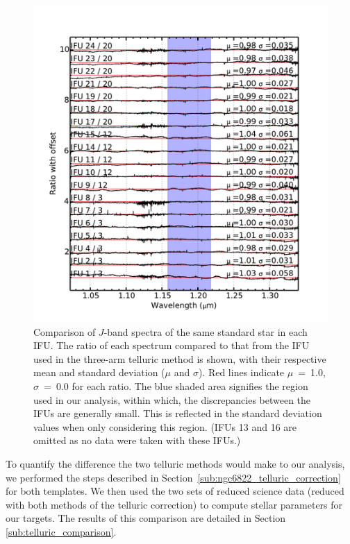 \begin{figure}
 \centering
 \begin{center}
 \includegraphics[width=12.0cm]{ngc6822/N6822_t_compare}
 \caption{
    Comparison of $J$-band spectra of the same standard star in each IFU.
    The ratio of each spectrum compared to that from the IFU used in the three-arm telluric method is shown,
    with their respective mean and standard deviation ($\mu$ and $\sigma$).
    Red lines indicate $\mu$~=~1.0, $\sigma$~=~0.0 for each ratio.
    The blue shaded area signifies the region used in our analysis,
    within which, the discrepancies between the IFUs are generally small.
    This is reflected in the standard deviation values when only considering this region.
    (IFUs 13 and 16 are omitted as no data were taken with these IFUs.) \label{fig:IFU_compare}
          }
 \end{center}
\end{figure}

To quantify the difference the two telluric methods would make to our analysis,
we performed the steps described in
Section~\ref{sub:ngc6822_telluric_correction} for both templates.
We then used the two sets of reduced science data
(reduced with both methods of the telluric correction) to compute stellar parameters for our targets.
The results of this comparison are detailed in Section
\ref{sub:telluric_comparison}.

